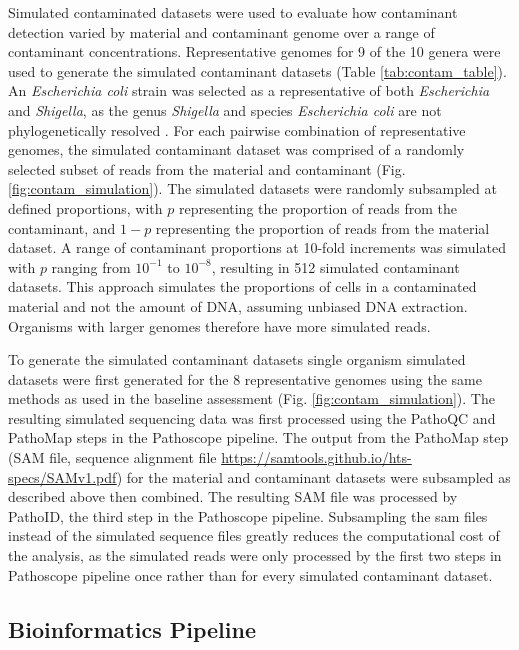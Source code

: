 \documentclass[fleqn,10pt,lineno]{wlpeerj}\usepackage[]{graphicx}\usepackage[]{color}
\begin{document}
Simulated contaminated datasets were used to evaluate how contaminant detection varied by material and contaminant genome over a range of contaminant concentrations.
Representative genomes for 9 of the 10 genera were used to generate the simulated contaminant datasets (Table \ref{tab:contam_table}).
An \textit{Escherichia coli} strain was selected as a representative of both \textit{Escherichia} and \textit{Shigella}, as the genus \textit{Shigella} and species \textit{Escherichia coli} are not phylogenetically resolved \citep{lan2002escherichia}.
For each pairwise combination of representative genomes, the simulated contaminant dataset was comprised of a randomly selected subset of reads from the material and contaminant (Fig. \ref{fig:contam_simulation}).
The simulated datasets were randomly subsampled at defined proportions, with $p$ representing the proportion of reads from the contaminant, and $1-p$ representing the proportion of reads from the material dataset.
A range of contaminant proportions at 10-fold increments was simulated with $p$ ranging from $10^{-1}$ to $10^{-8}$, resulting in 512 simulated contaminant datasets.
This approach simulates the proportions of cells in a contaminated material and not the amount of DNA, assuming unbiased DNA extraction.
Organisms with larger genomes therefore have more simulated reads.


To generate the simulated contaminant datasets single organism simulated datasets were first generated for the 8 representative genomes using the same methods as used in the baseline assessment (Fig. \ref{fig:contam_simulation}).
The resulting simulated sequencing data was first processed using the PathoQC and PathoMap steps in the Pathoscope pipeline.
The output from the PathoMap step (SAM file, sequence alignment file \url{https://samtools.github.io/hts-specs/SAMv1.pdf}) for the material and contaminant datasets were subsampled as described above then combined.
The resulting SAM file was processed by PathoID, the third step in the Pathoscope pipeline.
Subsampling the sam files instead of the simulated sequence files greatly reduces the computational cost of the analysis, as the simulated reads were only processed by the first two steps in Pathoscope pipeline once rather than for every simulated contaminant dataset.


\subsection*{Bioinformatics Pipeline}
\end{document}
